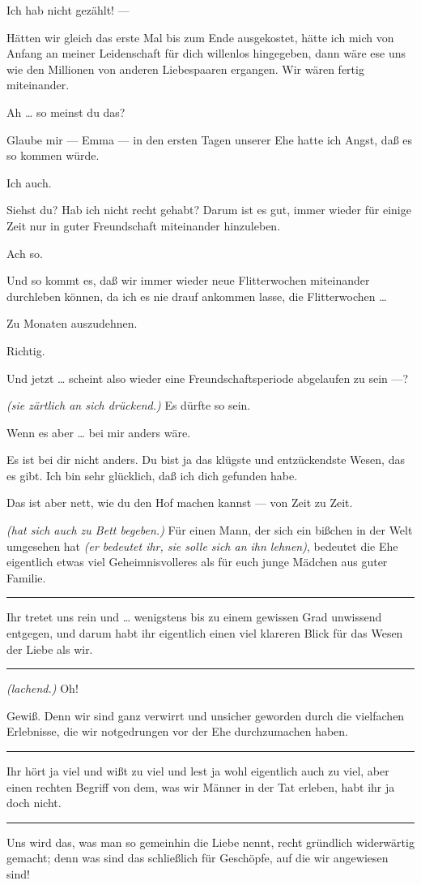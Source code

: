\documentclass[
	final,
	a4paper,
	ngerman,
	mpinclude = true, %
	twoside = true,
	open = right,
	cleardoublepage = plain,
	DIV = 13,
	BCOR = 1cm,
	titlepage = firstiscover,
	]{scrbook}
\newcommand{\direction}[1]{\textit{(#1)}}
\newenvironment{deletion}{%
		\vspace{0.25\baselineskip}
		\hrule
		\vspace{0.25\baselineskip}
		\color{darkgray}
	}{
		\color{black}
		\vspace{0.25\baselineskip}
		\hrule 
		\vspace{0.25\baselineskip}
	}
\newcommand{\thecharacter}[1]{\textup{\textsc{#1}}\xspace}
\newcommand{\thefrau}{\thecharacter{Junge Frau}}
\newcommand{\thegatte}{\thecharacter{Gatte}}
\newcommand{\character}[1]{\item[#1:]}
\newcommand{\frau}{\character{\thefrau}}
\newcommand{\gatte}{\character{\thegatte}}
\begin{document}
\begin{play}
	\frau
	Ich hab nicht gezählt! ---

	\gatte
	Hätten wir gleich das erste Mal bis zum Ende ausgekostet, hätte ich mich von Anfang an meiner Leidenschaft für dich willenlos hingegeben, dann wäre ese uns wie den Millionen von anderen Liebespaaren ergangen. Wir wären fertig miteinander.

	\frau
	Ah \ldots{} so meinst du das?

	\gatte
	Glaube mir --- Emma --- in den ersten Tagen unserer Ehe hatte ich Angst, daß es so kommen würde.

	\frau
	Ich auch.

	\gatte
	Siehst du? Hab ich nicht recht gehabt? Darum ist es gut, immer wieder für einige Zeit nur in guter Freundschaft miteinander hinzuleben.

	\frau
	Ach so.

	\gatte
	Und so kommt es, daß wir immer wieder neue Flitterwochen miteinander durchleben können, da ich es nie drauf ankommen lasse, die Flitterwochen \ldots{}

	\frau
	Zu Monaten auszudehnen.

	\gatte
	Richtig.

	\frau
	Und jetzt \ldots{} scheint also wieder eine Freundschaftsperiode abgelaufen zu sein ---?

	\gatte
	\direction{sie zärtlich an sich drückend.} Es dürfte so sein.

	\frau
	Wenn es aber \ldots{} bei mir anders wäre.

	\gatte
	Es ist bei dir nicht anders. Du bist ja das klügste und entzückendste Wesen, das es gibt. Ich bin sehr glücklich, daß ich dich gefunden habe.

	\frau
	Das ist aber nett, wie du den Hof machen kannst --- von Zeit zu Zeit.

	\gatte
	\direction{hat sich auch zu Bett begeben.} Für einen Mann, der sich ein bißchen in der Welt umgesehen hat \direction{er bedeutet ihr, sie solle sich an ihn lehnen}, bedeutet die Ehe eigentlich etwas viel Geheimnisvolleres als für euch junge Mädchen aus guter Familie.
	\begin{deletion}
		Ihr tretet uns rein und \ldots{} wenigstens bis zu einem gewissen Grad unwissend entgegen, und darum habt ihr eigentlich einen viel klareren Blick für das Wesen der Liebe als wir.
	\end{deletion}

	\frau
	\direction{lachend.} Oh!

	\gatte
	Gewiß. Denn wir sind ganz verwirrt und unsicher geworden durch die vielfachen Erlebnisse, die wir notgedrungen vor der Ehe durchzumachen haben.
	\begin{deletion}
		Ihr hört ja viel und wißt zu viel und lest ja wohl eigentlich auch zu viel, aber einen rechten Begriff von dem, was wir Männer in der Tat erleben, habt ihr ja doch nicht.
	\end{deletion}
	Uns wird das, was man so gemeinhin die Liebe nennt, recht gründlich widerwärtig gemacht; denn was sind das schließlich für Geschöpfe, auf die wir angewiesen sind!


\end{play}
\end{document}
